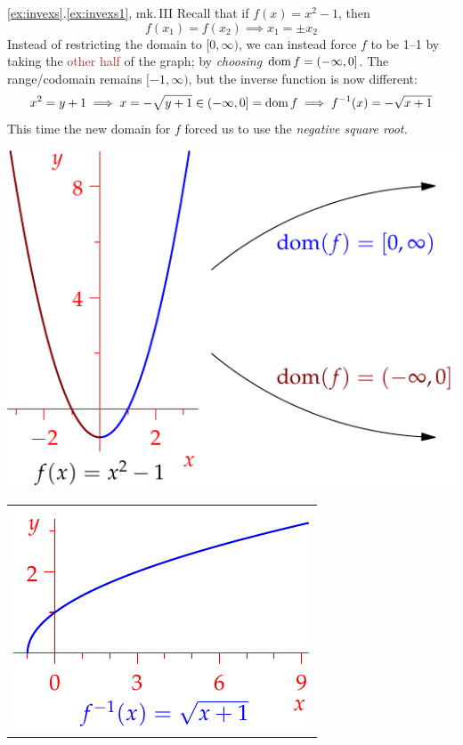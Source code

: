 \begin{example*}{\ref*{ex:invexs}.\ref{ex:invexs1}, mk.\,III}{}
	Recall that if $f(x)=x^2-1$, then
	\[
		f(x_1)=f(x_2)\implies x_1=\pm x_2
	\]
	Instead of restricting the domain to $[0,\infty)$, we can instead force $f$ to be 1--1 by taking the \textcolor{Brown}{other half} of the graph; by \emph{choosing} $\operatorname{dom} f=(-\infty,0]$. The range/codomain remains $[-1,\infty)$, but the inverse function is now different:
	\[
		x^2=y+1\implies x=-\sqrt{y+1}\in (-\infty,0]=\operatorname{dom} f \implies f^{-1}(x)=-\sqrt{x+1}
	\]
	This time the new domain for $f$ forced us to use the \emph{negative square root.}
	\begin{center}
		\begin{minipage}[t]{0.52\linewidth}\vspace{30pt}
			\centering\includegraphics{inverses-combi}
		\end{minipage}
		\begin{minipage}[t]{0.35\linewidth}\vspace{0pt}
			\centering
			\begin{tabular}{@{}c@{}}
				\includegraphics{inverses-combi2}\\[20pt]

\end{tabular}
\end{minipage}
\end{center}
\end{example*}
